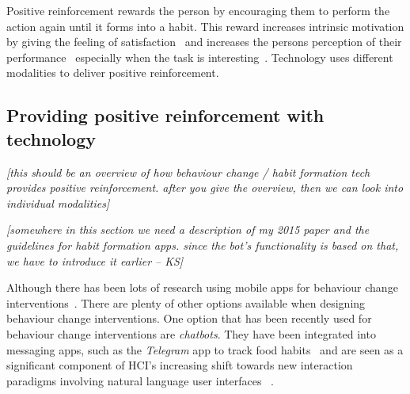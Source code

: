 \documentclass{scaffold/sigchi}
\begin{document}
Positive reinforcement rewards the person by encouraging them to perform the action again until it forms into a habit. This reward increases intrinsic motivation by giving the feeling of satisfaction~\cite{article_promoting_habit_formation} and increases the persons perception of their performance~\cite{positive_reinforcement_pro} especially when the task is interesting~\cite{article_meta_analytic_review_intrinsic_motivation}. Technology uses different modalities to deliver positive reinforcement.

\subsection{Providing positive reinforcement with technology}
\emph{[this should be an overview of how behaviour change / habit formation tech provides positive reinforcement. after you give the overview, then we can look into individual modalities]}

\emph{[somewhere in this section we need a description of my 2015 paper and the guidelines for habit formation apps. since the bot's functionality is based on that, we have to introduce it earlier -- KS]}

Although there has been lots of research using mobile apps for behaviour change interventions~\cite{survey_on_current_apps_of_steel}. There are plenty of other options available when designing behaviour change interventions. One option that has been recently used for behaviour change interventions are \textit{chatbots}. They have been integrated into messaging apps, such as the \textit{Telegram} app to track food habits~\cite{telegram_bot_tracking_habits} and are seen as a significant component of HCI's increasing shift towards new interaction paradigms involving natural language user interfaces%
~\cite{chatbots_and_new_world_of_hci}.
\end{document}
